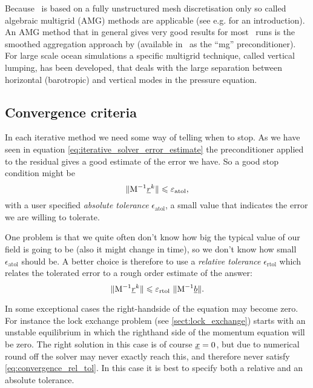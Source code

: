 Because \fluidity\ is based on a fully 
unstructured mesh discretisation only so called algebraic multigrid (AMG)
methods are applicable (see e.g. \citet{stueben2001} for an 
introduction). An AMG method that in general gives very good
results for most \fluidity\ runs is the smoothed aggregation approach by
\citet{vanek1996} (available in \fluidity\ as the ``mg'' 
preconditioner). For large scale ocean simulations a specific multigrid 
technique, called vertical lumping\citep{kramer2010},
has been developed, that deals with the large separation between
horizontal (barotropic) and vertical modes in the pressure equation.

\subsection{Convergence criteria}
In each iterative method we need some way of telling when to stop.
As we have seen in equation \eqref{eq:iterative_solver_error_estimate}
the preconditioner applied to the residual gives a good estimate of the
error we have. So a good stop condition might be
\begin{equation*}
  \|\mathrm{M}^{-1} \underline{r}^k\| \leqslant \varepsilon_{\text{atol}},
\end{equation*}
with a user specified 
\emph{absolute tolerance} $\epsilon_{\text{atol}}$, a small value
that indicates the error we are willing to tolerate.

One problem is that we quite often don't know how big the 
typical value of our field is going to be (also it might change in time),
so we don't know how small $\epsilon_{\text{atol}}$ should be.
A better choice is therefore to use a \emph{relative tolerance} 
$\epsilon_{\text{rtol}}$
which relates the tolerated error to a rough order estimate of the answer:
\begin{equation}\label{eq:convergence_rel_tol}
  \|\mathrm{M}^{-1} \underline{r}^k\| \leqslant 
    \varepsilon_{\text{rtol}}~ \|\mathrm{M}^{-1} \underline{b}\|.
\end{equation}

In some exceptional cases the right-handside of the equation may 
become zero. For instance the lock exchange problem 
(see \ref{sect:lock_exchange}) starts with an unstable equilibrium in which the righthand 
side of the momentum equation will be zero. The right solution in this case
is of course $\underline{x}=0$, but due to numerical round off the solver may
never exactly reach this, 
and therefore never satisfy \ref{eq:convergence_rel_tol}. In this case 
it is best to specify both a relative and an absolute tolerance.

